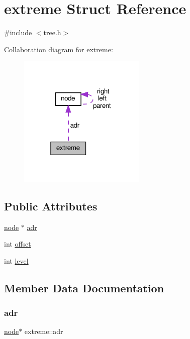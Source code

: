 \hypertarget{structextreme}{}\section{extreme Struct Reference}
\label{structextreme}


{\ttfamily \#include $<$tree.\+h$>$}



Collaboration diagram for extreme\+:
\nopagebreak
\begin{figure}[H]
\begin{center}
\leavevmode
\includegraphics[width=171pt]{structextreme__coll__graph}
\end{center}
\end{figure}
\subsection*{Public Attributes}
\begin{DoxyCompactItemize}
\item 
\hyperlink{structnode}{node} $\ast$ \hyperlink{structextreme_ab6b1591edc7b63297c3499df6c1d869a}{adr}
\item 
int \hyperlink{structextreme_a4a01f7889effe05776f9c7aab111452a}{offset}
\item 
int \hyperlink{structextreme_a80adaa7fa8a2fd6b51e092462628af3e}{level}
\end{DoxyCompactItemize}


\subsection{Member Data Documentation}
\mbox{\label{structextreme_ab6b1591edc7b63297c3499df6c1d869a}} 
\subsubsection{\texorpdfstring{adr}{adr}}
{\footnotesize\ttfamily \hyperlink{structnode}{node}$\ast$ extreme\+::adr}


